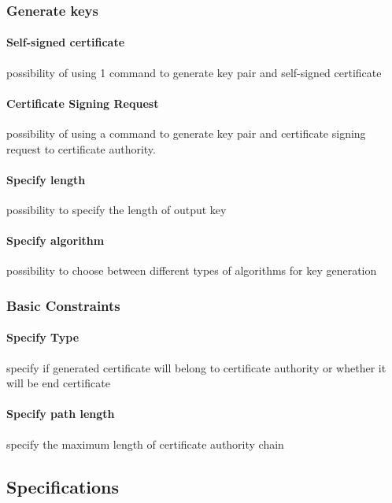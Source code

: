 \documentclass[10pt, a4paper]{report}
\begin{document}
\subsubsection{Generate keys}

\paragraph{Self-signed certificate}
possibility of using 1 command to generate key pair and self-signed certificate

\paragraph{Certificate Signing Request}
possibility of using a command to generate key pair and certificate signing request to certificate authority.

\paragraph{Specify length}
possibility to specify the length of output key

\paragraph{Specify algorithm}
possibility to choose between different types of algorithms for key generation


\subsubsection{Basic Constraints}

\paragraph{Specify Type}
specify if generated certificate will belong to certificate authority or whether it will be end certificate

\paragraph{Specify path length}
specify the maximum length of certificate authority chain


\subsection{Specifications}
\end{document}
